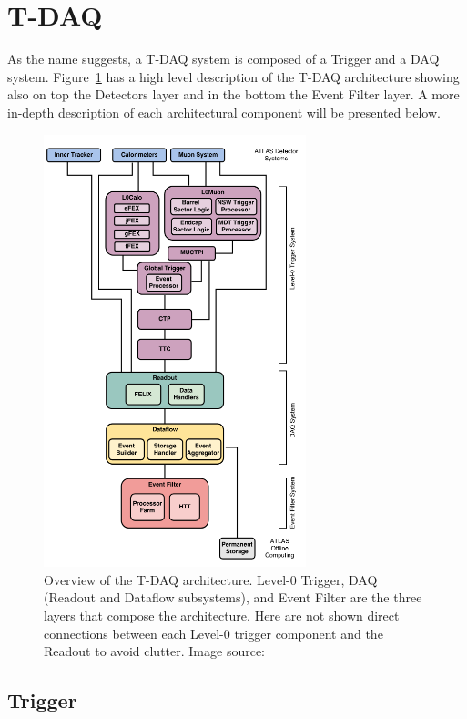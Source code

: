 \clearpage
\section{\acf{T-DAQ}}

As the name suggests, a \acf{T-DAQ} system is composed of a Trigger and a \acf{DAQ} system. Figure~\ref{fig:tdaq} has a high level description of the \acs{T-DAQ} architecture showing also on top the Detectors layer and in the bottom the Event Filter layer. A  more in-depth description of each architectural component will be presented below.

\begin{figure}[htbp]
\centering
\includegraphics[width=0.68\textwidth]{images/introduction/tdaq.png}
\caption[Overview of the T-DAQ architecture]{Overview of the \acs{T-DAQ} architecture. Level-0 Trigger, DAQ (Readout and Dataflow subsystems),
and Event Filter are the three layers that compose the architecture. Here are not shown direct connections between each Level-0 trigger component and the Readout to avoid clutter. Image source: \protect\cite{tdaq}}
\label{fig:tdaq}
\end{figure}

\subsection{Trigger}

